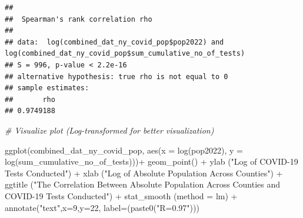\documentclass[
  12pt,
]{article}
\newenvironment{Shaded}{\begin{snugshade}}{\end{snugshade}}
\newcommand{\AttributeTok}[1]{\textcolor[rgb]{0.77,0.63,0.00}{#1}}
\newcommand{\CommentTok}[1]{\textcolor[rgb]{0.56,0.35,0.01}{\textit{#1}}}
\newcommand{\DecValTok}[1]{\textcolor[rgb]{0.00,0.00,0.81}{#1}}
\newcommand{\FunctionTok}[1]{\textcolor[rgb]{0.00,0.00,0.00}{#1}}
\newcommand{\NormalTok}[1]{#1}
\newcommand{\OtherTok}[1]{\textcolor[rgb]{0.56,0.35,0.01}{#1}}
\newcommand{\SpecialCharTok}[1]{\textcolor[rgb]{0.00,0.00,0.00}{#1}}
\newcommand{\StringTok}[1]{\textcolor[rgb]{0.31,0.60,0.02}{#1}}
\begin{document}
\begin{Shaded}
\end{Shaded}

\begin{verbatim}
## 
##  Spearman's rank correlation rho
## 
## data:  log(combined_dat_ny_covid_pop$pop2022) and log(combined_dat_ny_covid_pop$sum_cumulative_no_of_tests)
## S = 996, p-value < 2.2e-16
## alternative hypothesis: true rho is not equal to 0
## sample estimates:
##       rho 
## 0.9749188
\end{verbatim}

\begin{Shaded}
\begin{Highlighting}[]
\CommentTok{\# Visualize plot (Log{-}transformed for better visualization)}

\FunctionTok{ggplot}\NormalTok{(combined\_dat\_ny\_covid\_pop, }\FunctionTok{aes}\NormalTok{(}\AttributeTok{x =} \FunctionTok{log}\NormalTok{(pop2022), }\AttributeTok{y =} \FunctionTok{log}\NormalTok{(sum\_cumulative\_no\_of\_tests)))}\SpecialCharTok{+}
  \FunctionTok{geom\_point}\NormalTok{() }\SpecialCharTok{+}
  \FunctionTok{ylab}\NormalTok{ (}\StringTok{"Log of COVID{-}19 Tests Conducted"}\NormalTok{) }\SpecialCharTok{+}
  \FunctionTok{xlab}\NormalTok{ (}\StringTok{"Log of Absolute Population Across Counties"}\NormalTok{) }\SpecialCharTok{+}
  \FunctionTok{ggtitle}\NormalTok{ (}\StringTok{"The Correlation Between Absolute Population }
\StringTok{           Across Counties and COVID{-}19 Tests Conducted"}\NormalTok{) }\SpecialCharTok{+}
  \FunctionTok{stat\_smooth}\NormalTok{ (}\AttributeTok{method =} \StringTok{\textquotesingle{}lm\textquotesingle{}}\NormalTok{) }\SpecialCharTok{+}
  \FunctionTok{annotate}\NormalTok{(}\StringTok{"text"}\NormalTok{,}\AttributeTok{x=}\DecValTok{9}\NormalTok{,}\AttributeTok{y=}\DecValTok{22}\NormalTok{, }\AttributeTok{label=}\NormalTok{(}\FunctionTok{paste0}\NormalTok{(}\StringTok{"R=0.97"}\NormalTok{)))}
\end{Highlighting}
\end{Shaded}
\end{document}
